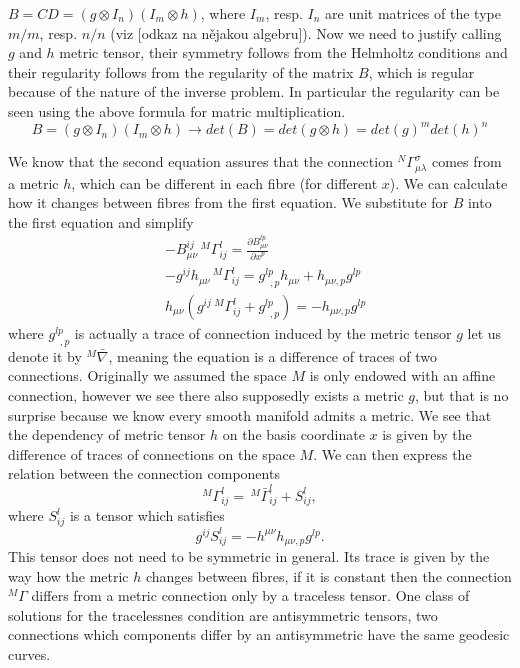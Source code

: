 \documentclass[english]{article}
\begin{document}
$B =CD=(g\otimes I_n)(I_m\otimes h)$, where $I_m$, resp. $I_n$ are unit matrices of the type $m/m$, resp. $n/n$ (viz [odkaz na nějakou algebru]). Now we need to justify calling $g$ and $h$ metric tensor, their symmetry follows from the Helmholtz conditions and their regularity follows from the regularity of the matrix $B$, which is regular because of the nature of the inverse problem. In particular the regularity can be seen using the above formula for matric multiplication.
$$
B = (g\otimes I_n)(I_m\otimes h)\longrightarrow det(B)=det\left(g\otimes h\right)=det(g)^mdet(h)^n
$$


We know that the second equation assures that the connection $^N\Gamma^\sigma_{\mu\lambda}$ comes from a metric $h$, which can be different in each fibre (for different $x$). We can calculate how it changes between fibres from the first equation. We substitute for $B$ into the first equation and simplify
\begin{align*}
&-B^{ij}_{\mu\nu}\,^M\Gamma^l_{ij}=\frac{\partial B^{lp}_{\mu\nu}}{\partial x^p}\\
&-g^{ij}h_{\mu\nu}\,^M\Gamma^l_{ij}=g^{lp}_{\,\,\,,p}h_{\mu\nu}+h_{\mu\nu,p}g^{lp}\\
&h_{\mu\nu}\left(g^{ij}\,^M\Gamma^l_{ij}+g^{lp}_{\,\,\,,p}\right)=-h_{\mu\nu,p}g^{lp}
\end{align*}
where $g^{lp}_{\,\,\,,p}$ is actually a trace of connection induced by the metric tensor $g$ let us denote it by $^M\bar{\nabla}$, meaning the equation is a difference of traces of two connections. Originally we assumed the space $M$ is only endowed with an affine connection, however we see there also supposedly exists a metric $g$, but that is no surprise because we know every smooth manifold admits a metric. We see that the dependency of metric tensor $h$ on the basis coordinate $x$ is given by the difference of traces of connections on the space $M$.
We can then express the relation between the connection components 
$$
^M\Gamma^l_{ij}= \, ^M\bar{\Gamma}^l_{ij}+S^l_{ij},
$$
where $S^l_{ij}$ is a tensor which satisfies
$$
g^{ij}S^l_{ij}=-h^{\mu\nu}h_{\mu\nu,p}g^{lp}.
$$
This tensor does not need to be symmetric in general. Its trace is given by the way how the metric $h$ changes between fibres, if it is constant then the connection $^M\Gamma$ differs from a metric connection only by a traceless tensor. One class of solutions for the tracelessnes condition are antisymmetric tensors, two connections which components differ by an antisymmetric have the same geodesic curves.
\end{document}
